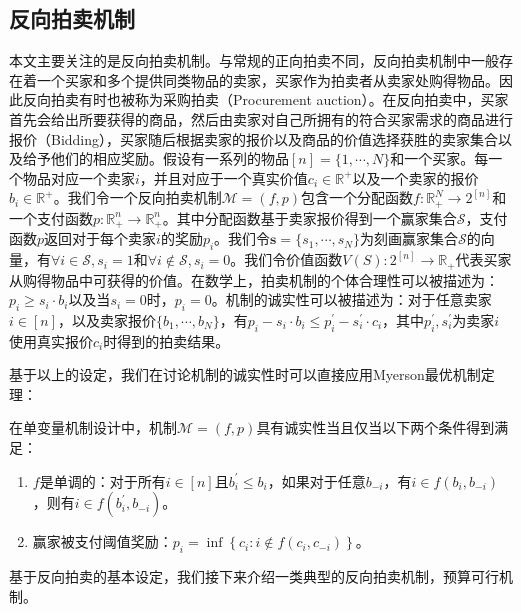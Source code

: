 


\subsection{反向拍卖机制}

本文主要关注的是反向拍卖机制。与常规的正向拍卖不同，反向拍卖机制中一般存在着一个买家和多个提供同类物品的卖家，买家作为拍卖者从卖家处购得物品。因此反向拍卖有时也被称为采购拍卖（Procurement auction）\cite{Nisan07}。在反向拍卖中，买家首先会给出所要获得的商品，然后由卖家对自己所拥有的符合买家需求的商品进行报价（Bidding），买家随后根据卖家的报价以及商品的价值选择获胜的卖家集合以及给予他们的相应奖励。假设有一系列的物品$[n]=\{1,\cdots,N\}$和一个买家。每一个物品对应一个卖家$i$，并且对应于一个真实价值$c_i\in\mathbb{R}^+$以及一个卖家的报价$b_i\in\mathbb{R}^+$。我们令一个反向拍卖机制$\mathcal{M}=(f, p)$包含一个分配函数$f: \mathbb{R}_{+}^{N} \rightarrow 2^{[n]}$和一个支付函数$p: \mathbb{R}_{+}^{n} \rightarrow \mathbb{R}_{+}^{n}$。其中分配函数基于卖家报价得到一个赢家集合$\mathcal{S}$，支付函数$p$返回对于每个卖家$i$的奖励$p_i$。我们令$\mathbf{s}=\{s_1,\cdots,s_N\}$为刻画赢家集合$\mathcal{S}$的向量，有$\forall i\in\mathcal{S}, s_i=1$和$\forall i\notin\mathcal{S}, s_i=0$。我们令价值函数$V(S): 2^{[n]} \rightarrow \mathbb{R}_{+}$代表买家从购得物品中可获得的价值。在数学上，拍卖机制的个体合理性可以被描述为：$p_i\geq s_i\cdot b_i$以及当$s_i=0$时，$p_i=0$。机制的诚实性可以被描述为：对于任意卖家$i\in[n]$，以及卖家报价$\{b_1,\cdots,b_N\}$，有$p_{i}-s_{i} \cdot b_{i} \leq p_{i}^{\prime}-s_{i}^{\prime} \cdot c_{i}$，其中$p_{i}^{\prime},s_{i}^{\prime}$为卖家$i$使用真实报价$c_i$时得到的拍卖结果。

基于以上的设定，我们在讨论机制的诚实性时可以直接应用Myerson最优机制定理\cite{Myerson1981}：
\begin{thm}
在单变量机制设计中，机制$\mathcal{M}=(f, p)$具有诚实性当且仅当以下两个条件得到满足：
\begin{enumerate}
\item $f$是单调的：对于所有$i \in[n]$且$b_{i}^{\prime} \leq b_{i}$，如果对于任意$b_{-i}$，有$i\in f\left(b_{i}, b_{-i}\right)$，则有$i \in f\left(b_{i}^{\prime}, b_{-i}\right)$。
\item 赢家被支付阈值奖励：$p_i = \inf \left\{c_{i}: i \notin f\left(c_{i}, c_{-i}\right)\right\}$。
\end{enumerate}
\end{thm}
基于反向拍卖的基本设定，我们接下来介绍一类典型的反向拍卖机制，预算可行机制。


